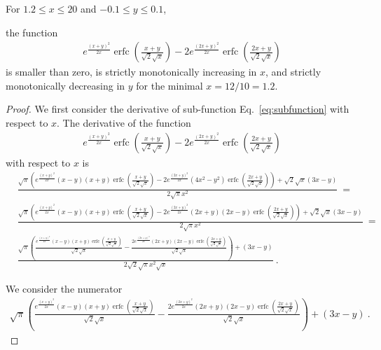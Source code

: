 \documentclass{article}
\renewcommand{\leq}{\leqslant}
\DeclareMathOperator{\erfc}{erfc}
\begin{document}
\begin{lemma}
\label{proof:mainsubfunction}
For $1.2 \leq x \leq 20$ and $-0.1 \leq y \leq 0.1$, 

the function
\begin{align}
e^{\frac{(x+y)^2}{2 x}} \erfc \left(\frac{x+y}{\sqrt{2} \sqrt{x}}\right)-2 e^{\frac{(2 x+y)^2}{2 x}} \erfc \left(\frac{2 x+y}{\sqrt{2} \sqrt{x}}\right)
\end{align}
is smaller than zero, is strictly monotonically increasing in $x$,
and strictly monotonically decreasing in $y$ for the minimal $x=12/10=1.2$.
\end{lemma}

\begin{proof}
We first consider the derivative of sub-function
Eq.~\eqref{eq:subfunction} with respect to $x$.
The derivative of the function 
\begin{align}
e^{\frac{(x+y)^2}{2 x}} \erfc \left(\frac{x+y}{\sqrt{2} \sqrt{x}}\right)-2 e^{\frac{(2 x+y)^2}{2 x}} \erfc \left(\frac{2 x+y}{\sqrt{2} \sqrt{x}}\right)
\end{align}
with respect to $x$ is
\begin{align}
&\frac{\sqrt{\pi } \left(e^{\frac{(x+y)^2}{2 x}} (x-y) (x+y)
  \erfc \left(\frac{x+y}{\sqrt{2} \sqrt{x}}\right)-2 e^{\frac{(2
  x+y)^2}{2 x}} \left(4 x^2-y^2\right) \erfc \left(\frac{2
  x+y}{\sqrt{2} \sqrt{x}}\right)\right)+\sqrt{2} \sqrt{x} (3 x-y)}{2
  \sqrt{\pi } x^2}\ = \\ \nonumber &\frac{\sqrt{\pi } \left(e^{\frac{(x+y)^2}{2 x}}
  (x-y) (x+y) \erfc \left(\frac{x+y}{\sqrt{2} \sqrt{x}}\right)-2
  e^{\frac{(2 x+y)^2}{2 x}} (2 x+y) (2 x-y) \erfc \left(\frac{2
  x+y}{\sqrt{2} \sqrt{x}}\right)\right)+\sqrt{2} \sqrt{x} (3 x-y)}{2
  \sqrt{\pi } x^2} \ = \\ \nonumber &\frac{\sqrt{\pi } \left(\frac{e^{\frac{(x+y)^2}{2
  x}} (x-y) (x+y) \erfc \left(\frac{x+y}{\sqrt{2}
  \sqrt{x}}\right)}{\sqrt{2} \sqrt{x}}-\frac{2 e^{\frac{(2 x+y)^2}{2
  x}} (2 x+y) (2 x-y) \erfc \left(\frac{2 x+y}{\sqrt{2}
  \sqrt{x}}\right)}{\sqrt{2} \sqrt{x}}\right)+(3 x-y)}{2 \sqrt{2} 
  \sqrt{\pi }  x^2 \sqrt{x}} \ .
\end{align} 


We consider the numerator
\begin{align}
\sqrt{\pi } \left(\frac{e^{\frac{(x+y)^2}{2 x}} (x-y) (x+y)
  \erfc \left(\frac{x+y}{\sqrt{2} \sqrt{x}}\right)}{\sqrt{2}
  \sqrt{x}}-\frac{2 e^{\frac{(2 x+y)^2}{2 x}} (2 x+y) (2 x-y)
  \erfc \left(\frac{2 x+y}{\sqrt{2} \sqrt{x}}\right)}{\sqrt{2}
  \sqrt{x}}\right)+(3 x-y) \ .
\end{align}


\end{proof}
\end{document}
